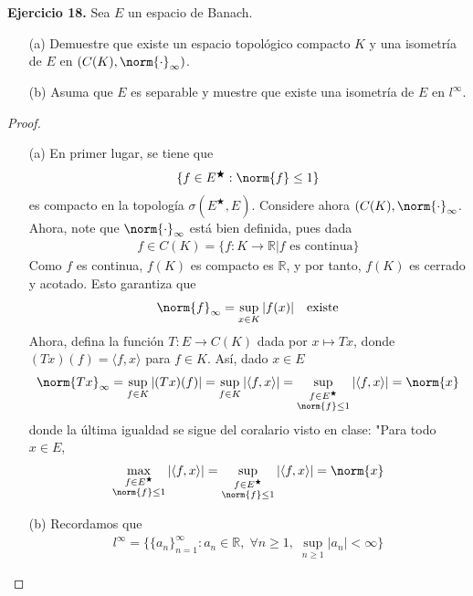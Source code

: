 \textbf{Ejercicio 18.} Sea $E$ un espacio de Banach.
\begin{enumerate}
    \item[(a)] Demuestre que existe un espacio topológico compacto $K$ y una isometría de $E$ en $(C(K),\norm{\cdot}_\infty)$. 

    \item[(b)] Asuma que $E$ es separable y muestre que existe una isometría de $E$ en $l^\infty$.
\end{enumerate}
\begin{proof}
    \begin{enumerate}
        \item[(a)] En primer lugar, se tiene que 
    \begin{align*}
        \{f\in E^{\bigstar}:\norm{f}\leq 1\}
    \end{align*}
    es compacto en la topología $\sigma(E^{\bigstar},E)$. Considere ahora $(C(K),\norm{\cdot}_{\infty}$. Ahora, note que $\norm{\cdot}_\infty$ está bien definida, pues dada
    \begin{align*}
        f\in C(K)=\{f:K\to \mathbb{R} |f \text{ es continua}\}
    \end{align*}
    Como $f$ es continua, $f(K)$ es compacto es $\mathbb{R}$, y por tanto, $f(K)$ es cerrado y acotado. Esto garantiza que
    \begin{align*}
        \norm{f}_{\infty}=\sup_{x\in K}|f(x)| \quad \text{existe}
    \end{align*}
    Ahora, defina la función $T:E\to C(K)$ dada por $x\mapsto Tx$, donde $(Tx)(f)=\langle f,x\rangle$ para $f\in K$. Así, dado $x\in E$
    \begin{align*}
        \norm{Tx}_{\infty}=\sup_{f\in K}|(Tx)(f)| =\sup_{f\in K}|\langle f,x\rangle|=\sup_{\substack{f \in E^{\bigstar}\\ \norm{f}\leq1}}|\langle f,x\rangle|=\norm{x}
    \end{align*}
    donde la última igualdad se sigue del coralario visto en clase: "Para todo $x\in E$, 
    \begin{align*}
        \max_{\substack{f \in E^{\bigstar}\\ \norm{f}\leq1}}|\langle f,x\rangle|=\sup_{\substack{f \in E^{\bigstar}\\ \norm{f}\leq1}}|\langle f,x\rangle|=\norm{x}
    \end{align*}
    \item[(b)] Recordamos que 
    \begin{align*}
        l^{\infty}=\{\{a_n\}_{n=1}^{\infty}:a_n\in \mathbb{R},\;\forall n\geq1,\;\sup_{n\geq 1}|a_n|<\infty\}

\end{align*}
\end{enumerate}
\end{proof}
